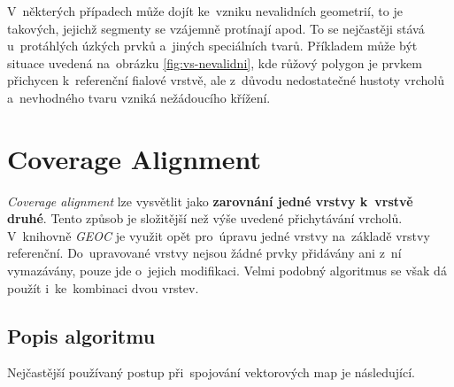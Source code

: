 V~některých případech může dojít ke~vzniku nevalidních geometrií, to je takových,
jejichž segmenty se vzájemně protínají apod. To se nejčastěji stává u~protáhlých 
úzkých prvků a~jiných speciálních tvarů. Příkladem může být situace uvedená 
na~obrázku \ref{fig:vs-nevalidni}, kde růžový polygon je prvkem přichycen 
k~referenční fialové vrstvě, ale z~důvodu nedostatečné hustoty vrcholů a~nevhodného
tvaru vzniká nežádoucího křížení. 




\section{Coverage Alignment} 
\label{coverage alignment}

\textit{Coverage alignment} lze vysvětlit jako \textbf{zarovnání jedné vrstvy 
k~vrstvě druhé}. Tento způsob je složitější než výše uvedené přichytávání vrcholů.
V~knihovně \textit{GEOC} je využit opět pro~úpravu jedné vrstvy na~základě vrstvy 
referenční. Do~upravované vrstvy nejsou žádné prvky přidávány ani z~ní vymazávány,
pouze jde o~jejich modifikaci. Velmi podobný algoritmus se však dá použít 
i~ke~kombinaci dvou vrstev. 

\subsection{Popis algoritmu}
\label{ca-algoritmus}

Nejčastější používaný postup při~spojování vektorových map je následující.

